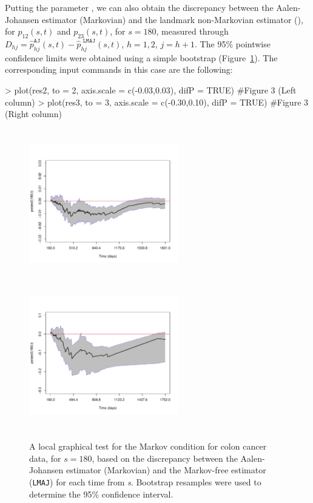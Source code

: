Putting the parameter , we can also obtain the discrepancy between the Aalen-Johansen estimator (Markovian) and the landmark non-Markovian estimator (), for $p_{12}(s,t)$ and $p_{23}(s,t)$, for $s=180$, measured through $D_{hj}=\widehat p_{hj}^{\texttt{AJ}}(s,t)-\widehat p_{hj}^{\texttt{ LMAJ}}(s,t)$, $h=1,2$, $j=h+1$. The 95\% pointwise confidence limits were obtained using a simple bootstrap (Figure~\ref{fig6}). The corresponding input commands in this case are the following:

\begin{example}
> plot(res2, to = 2, axis.scale = c(-0.03,0.03), difP = TRUE) #Figure 3 (Left column)
> plot(res3, to = 3, axis.scale = c(-0.30,0.10), difP = TRUE) #Figure 3 (Right column)
\end{example}


\begin{figure} [t] %
\begin{center}
\includegraphics[width=6.5cm, height=6.5cm]{Fig6/1_t180_new2.pdf}
\includegraphics[width=6.5cm, height=6.5cm]{Fig6/2_t180_new2.pdf}\\

\caption{A local graphical test for the Markov condition for colon cancer data, for $s = 180$, based on the discrepancy between the Aalen-Johansen estimator (Markovian) and the Markov-free estimator (\texttt{LMAJ}) for each time from \textit{s}. Bootstrap resamples were used to determine the 95\% confidence interval.}
\label{fig6}
\end{center}
\end{figure}

